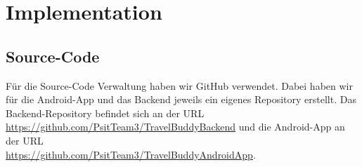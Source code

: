 \section{Implementation}
\subsection{Source-Code}\label{sourcecode}
Für die Source-Code Verwaltung haben wir GitHub verwendet.
Dabei haben wir für die Android-App und das Backend jeweils ein eigenes Repository erstellt.
Das Backend-Repository befindet sich an der URL \\
\url{https://github.com/PsitTeam3/TravelBuddyBackend}
und die Android-App an der URL \\
\url{https://github.com/PsitTeam3/TravelBuddyAndroidApp}.

